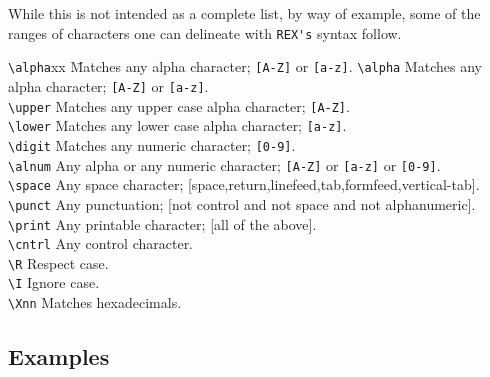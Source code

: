 While this is not intended as a complete list, by way of example, some
of the ranges of characters one can delineate with \verb`REX's` syntax
follow.

\begin{tabbing}
\verb`\alpha`xx \= Matches any alpha character; \verb`[A-Z]` or \verb`[a-z]`.  \kill
\verb`\alpha`   \> Matches any alpha character; \verb`[A-Z]` or \verb`[a-z]`.    \\
\verb`\upper`   \> Matches any upper case alpha character; \verb`[A-Z]`.  \\
\verb`\lower`   \> Matches any lower case alpha character; \verb`[a-z]`.  \\
\verb`\digit`   \> Matches any numeric character; \verb`[0-9]`.           \\
\verb`\alnum`   \> Any alpha or any numeric character; \verb`[A-Z]` or \verb`[a-z]` or \verb`[0-9]`.  \\
\verb`\space`   \> Any space character; [space,return,linefeed,tab,formfeed,vertical-tab].  \\
\verb`\punct`   \> Any punctuation; [not control and not space and not alphanumeric].  \\
\verb`\print`   \> Any printable character; [all of the above].  \\
\verb`\cntrl`   \> Any control character.   \\
\verb`\R`       \> Respect case.            \\
\verb`\I`       \> Ignore case.             \\
\verb`\Xnn`     \> Matches hexadecimals.
\end{tabbing}

\subsection{Examples}

